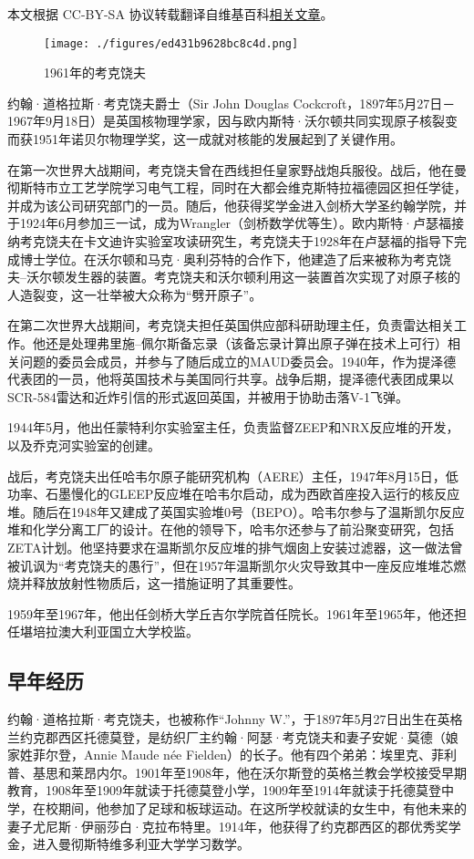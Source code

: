
本文根据 CC-BY-SA 协议转载翻译自维基百科\href{https://en.wikipedia.org/wiki/John_Cockcroft}{相关文章}。

\begin{figure}[ht]
\centering
\texttt{[image: ./figures/ed431b9628bc8c4d.png]}
\caption{1961年的考克饶夫} \label{fig_YHkrf_1}
\end{figure}
约翰·道格拉斯·考克饶夫爵士（Sir John Douglas Cockcroft，1897年5月27日－1967年9月18日）是英国核物理学家，因与欧内斯特·沃尔顿共同实现原子核裂变而获1951年诺贝尔物理学奖，这一成就对核能的发展起到了关键作用。

在第一次世界大战期间，考克饶夫曾在西线担任皇家野战炮兵服役。战后，他在曼彻斯特市立工艺学院学习电气工程，同时在大都会维克斯特拉福德园区担任学徒，并成为该公司研究部门的一员。随后，他获得奖学金进入剑桥大学圣约翰学院，并于1924年6月参加三一试，成为Wrangler（剑桥数学优等生）。欧内斯特·卢瑟福接纳考克饶夫在卡文迪许实验室攻读研究生，考克饶夫于1928年在卢瑟福的指导下完成博士学位。在沃尔顿和马克·奥利芬特的合作下，他建造了后来被称为考克饶夫–沃尔顿发生器的装置。考克饶夫和沃尔顿利用这一装置首次实现了对原子核的人造裂变，这一壮举被大众称为“劈开原子”。

在第二次世界大战期间，考克饶夫担任英国供应部科研助理主任，负责雷达相关工作。他还是处理弗里施–佩尔斯备忘录（该备忘录计算出原子弹在技术上可行）相关问题的委员会成员，并参与了随后成立的MAUD委员会。1940年，作为提泽德代表团的一员，他将英国技术与美国同行共享。战争后期，提泽德代表团成果以SCR-584雷达和近炸引信的形式返回英国，并被用于协助击落V-1飞弹。

1944年5月，他出任蒙特利尔实验室主任，负责监督ZEEP和NRX反应堆的开发，以及乔克河实验室的创建。

战后，考克饶夫出任哈韦尔原子能研究机构（AERE）主任，1947年8月15日，低功率、石墨慢化的GLEEP反应堆在哈韦尔启动，成为西欧首座投入运行的核反应堆。随后在1948年又建成了英国实验堆0号（BEPO）。哈韦尔参与了温斯凯尔反应堆和化学分离工厂的设计。在他的领导下，哈韦尔还参与了前沿聚变研究，包括ZETA计划。他坚持要求在温斯凯尔反应堆的排气烟囱上安装过滤器，这一做法曾被讥讽为“考克饶夫的愚行”，但在1957年温斯凯尔火灾导致其中一座反应堆堆芯燃烧并释放放射性物质后，这一措施证明了其重要性。

1959年至1967年，他出任剑桥大学丘吉尔学院首任院长。1961年至1965年，他还担任堪培拉澳大利亚国立大学校监。
\subsection{早年经历}
约翰·道格拉斯·考克饶夫，也被称作“Johnny W.”，于1897年5月27日出生在英格兰约克郡西区托德莫登，是纺织厂主约翰·阿瑟·考克饶夫和妻子安妮·莫德（娘家姓菲尔登，Annie Maude née Fielden）的长子。他有四个弟弟：埃里克、菲利普、基思和莱昂内尔。1901年至1908年，他在沃尔斯登的英格兰教会学校接受早期教育，1908年至1909年就读于托德莫登小学，1909年至1914年就读于托德莫登中学，在校期间，他参加了足球和板球运动。在这所学校就读的女生中，有他未来的妻子尤尼斯·伊丽莎白·克拉布特里。1914年，他获得了约克郡西区的郡优秀奖学金，进入曼彻斯特维多利亚大学学习数学。

